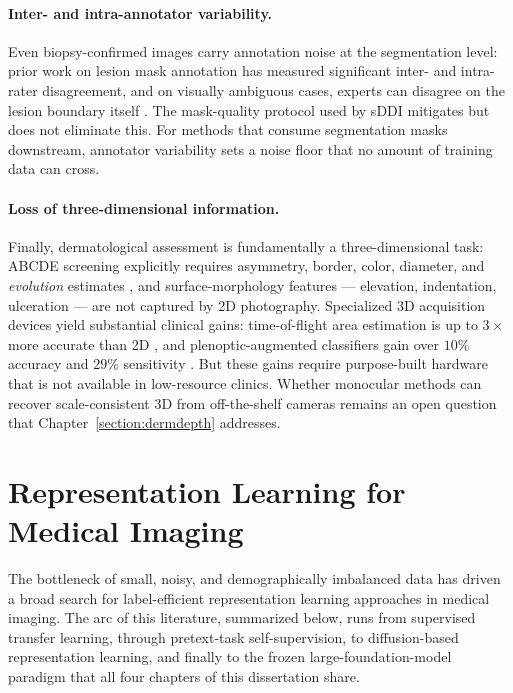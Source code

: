 \documentclass[11pt]{ucthesis}
\begin{document}
\paragraph{Inter- and intra-annotator variability.}
Even biopsy-confirmed images carry annotation noise at the segmentation level: prior work on lesion mask annotation has measured significant inter- and intra-rater disagreement, and on visually ambiguous cases, experts can disagree on the lesion boundary itself \cite{mirikharaji2021d,Mirikharaji2020DLEMADL}. The mask-quality protocol used by sDDI \cite{carrion-2023} mitigates but does not eliminate this. For methods that consume segmentation masks downstream, annotator variability sets a noise floor that no amount of training data can cross.

\paragraph{Loss of three-dimensional information.}
Finally, dermatological assessment is fundamentally a three-dimensional task: ABCDE screening explicitly requires asymmetry, border, color, diameter, and \emph{evolution} estimates \cite{argenziano-1998,blum-2003}, and surface-morphology features --- elevation, indentation, ulceration --- are not captured by 2D photography. Specialized 3D acquisition devices yield substantial clinical gains: time-of-flight area estimation is up to $3\times$ more accurate than 2D \cite{juszczyk-2020}, and plenoptic-augmented classifiers gain over $10\%$ accuracy and $29\%$ sensitivity \cite{pereira-2021}. But these gains require purpose-built hardware that is not available in low-resource clinics. Whether monocular methods can recover scale-consistent 3D from off-the-shelf cameras remains an open question that Chapter~\ref{section:dermdepth} addresses.

\section{Representation Learning for Medical Imaging}
\label{sec:bg_repr}

The bottleneck of small, noisy, and demographically imbalanced data has driven a broad search for label-efficient representation learning approaches in medical imaging. The arc of this literature, summarized below, runs from supervised transfer learning, through pretext-task self-supervision, to diffusion-based representation learning, and finally to the frozen large-foundation-model paradigm that all four chapters of this dissertation share.
\end{document}
